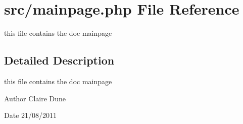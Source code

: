 \hypertarget{mainpage_8php}{
\section{src/mainpage.php \-File \-Reference}
\label{mainpage_8php}
}


this file contains the doc mainpage  




\subsection{\-Detailed \-Description}
this file contains the doc mainpage \begin{DoxyAuthor}{\-Author}
\-Claire \-Dune 
\end{DoxyAuthor}
\begin{DoxyDate}{\-Date}
21/08/2011 
\end{DoxyDate}
